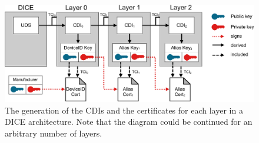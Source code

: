\begin{figure}[htpb]
  \centering
  \includegraphics[width=1\linewidth]{figures/dice-layers.pdf}
  \caption{The generation of the CDIs and the certificates for each layer in a DICE architecture. Note that the diagram could be continued for an arbitrary number of layers.} \label{fig:dice-layers}
\end{figure}
